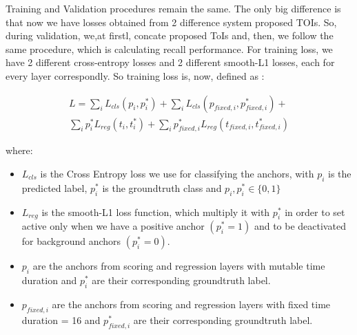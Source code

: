 \par
Training and Validation procedures remain the same. The only big difference is that now we have losses obtained from 2 difference system proposed TOIs. So, during validation, we,at firstl, concate
proposed ToIs and, then, we follow the same procedure, which is calculating recall performance. For training loss, we have 2 different cross-entropy losses and 2 different smooth-L1 losses, each for every
layer correspondly. So training loss is, now, defined as :





\begin{equation} 
\begin{split}
 L  =  \sum_iL_{cls}(p_i, p_i^*) + \sum_iL_{cls}(p_{fixed,i}, p_{fixed,i}^*) + \\
   \sum_ip_i^*L_{reg}(t_i,t_i^*) + \sum_ip_{fixed,i}^*L_{reg}(t_{fixed,i},t_{fixed,i}^*) 
\end{split}
\end{equation}

where:
\begin{itemize}
  \item $L_{cls} $ is the Cross Entropy loss we use for classifying the anchors, with $p_i$ is the predicted label, $p_i^*$ is the groundtruth class and
  $p_i, p_i^* \in \{0,1\}$
\item $L_{reg} $ is the smooth-L1 loss function, which multiply it with $p_i^*$ in order to set active only when we have a positive anchor $(p_i^* = 1)$
  and to be deactivated for background anchors $(p_i^* = 0)$.
\item $p_i $ are the anchors from scoring and regression layers with mutable time duration and $p_i^*$ are their corresponding groundtruth label.
\item $p_{fixed,i} $ are the anchors from scoring and regression layers with fixed time duration = 16 and $p_{fixed,i}^*$ are their corresponding groundtruth label.
\end{itemize}

